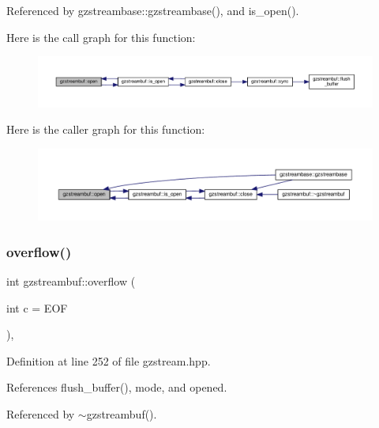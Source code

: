Referenced by gzstreambase\+::gzstreambase(), and is\+\_\+open().

Here is the call graph for this function\+:
\nopagebreak
\begin{figure}[H]
\begin{center}
\leavevmode
\includegraphics[width=350pt]{d7/de3/classgzstreambuf_af720bcd3058c97c90d11a3bcc57fda98_cgraph}
\end{center}
\end{figure}
Here is the caller graph for this function\+:
\nopagebreak
\begin{figure}[H]
\begin{center}
\leavevmode
\includegraphics[width=350pt]{d7/de3/classgzstreambuf_af720bcd3058c97c90d11a3bcc57fda98_icgraph}
\end{center}
\end{figure}
\mbox{\label{classgzstreambuf_a3152b230147cdb768bf87cf4009963ff}} 
\subsubsection{\texorpdfstring{overflow()}{overflow()}}
{\footnotesize\ttfamily int gzstreambuf\+::overflow (\begin{DoxyParamCaption}\item[{int}]{c = {\ttfamily EOF} }\end{DoxyParamCaption})\hspace{0.3cm}{\ttfamily [inline]}, {\ttfamily [override]}}



Definition at line 252 of file gzstream.\+hpp.



References flush\+\_\+buffer(), mode, and opened.



Referenced by $\sim$gzstreambuf().

